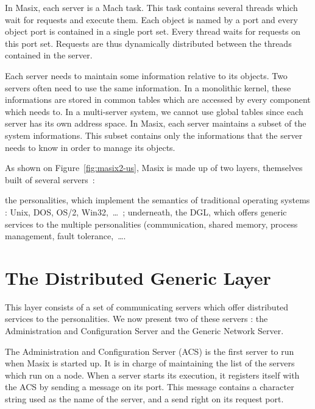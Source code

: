 
In Masix, each server is a Mach task. This task contains several
threads which wait for requests and execute them.
Each object is named by a port and every object
port is contained in a single port set. Every thread waits for requests on
this port set. Requests are thus dynamically distributed between the
threads contained in the server.


Each server needs to maintain some information relative to its
objects. Two servers often need to use the same information. In a monolithic
kernel, these informations are stored in common tables which are accessed by
every component which needs to. In a multi-server system, we cannot use global
tables since each server has its own address space. In Masix, each server
maintains a subset of the system informations. This subset contains only the
informations that the server needs to know in order to manage its objects.


As shown on Figure~\ref{fig:masix2-us}, Masix is made up of two layers, 
themselves built of several servers~:
\begin{itemize}
\myitem the personalities, which implement the semantics of traditional
operating systems : Unix, DOS, OS/2, Win32,~\dots~;
\myitem underneath, the DGL, which offers generic services to the multiple 
personalities (communication, shared memory, process management, fault 
tolerance,~\dots.
\end{itemize}


\section {The Distributed Generic Layer}

This layer consists of a set of communicating servers
which offer distributed services to the personalities. 
We now present two of these servers : the Administration and Configuration 
Server and the Generic Network Server.


The Administration and Configuration Server (ACS) is the first server
to run when Masix is started up. It is in charge of maintaining the list of
the servers which run on a node. 
When a server starts its execution, it registers itself with
the ACS by sending a message on its port. This message contains a character
string used as the name of the server, and a send right on its request port.

